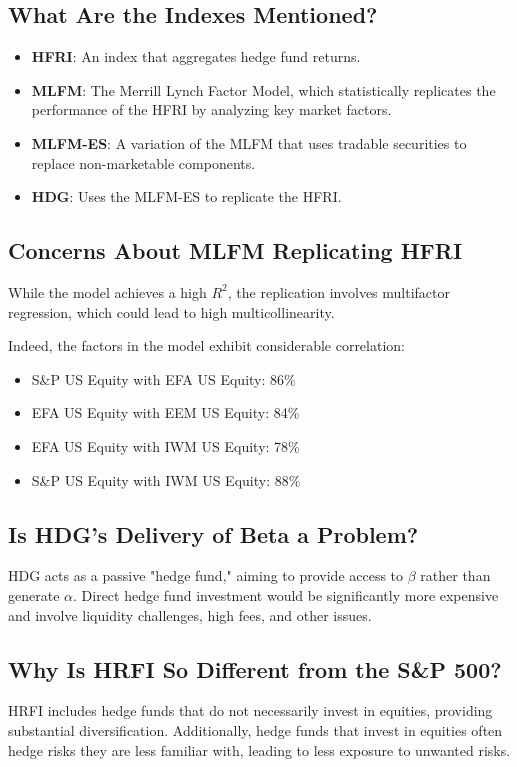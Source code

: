 \documentclass{article}
\begin{document}
\subsection{What Are the Indexes Mentioned?}
\begin{itemize}
    \item \textbf{HFRI}: An index that aggregates hedge fund returns.
    \item \textbf{MLFM}: The Merrill Lynch Factor Model, which statistically replicates the performance of the HFRI by analyzing key market factors.
    \item \textbf{MLFM-ES}: A variation of the MLFM that uses tradable securities to replace non-marketable components.
    \item \textbf{HDG}: Uses the MLFM-ES to replicate the HFRI.
\end{itemize}

\subsection{Concerns About MLFM Replicating HFRI}
While the model achieves a high $R^2$, the replication involves multifactor regression, which could lead to high multicollinearity.

Indeed, the factors in the model exhibit considerable correlation:
\begin{itemize}
    \item S\&P US Equity with EFA US Equity: 86\%
    \item EFA US Equity with EEM US Equity: 84\%
    \item EFA US Equity with IWM US Equity: 78\%
    \item S\&P US Equity with IWM US Equity: 88\%
\end{itemize}

\subsection{Is HDG's Delivery of Beta a Problem?}
HDG acts as a passive "hedge fund," aiming to provide access to $\beta$ rather than generate $\alpha$. Direct hedge fund investment would be significantly more expensive and involve liquidity challenges, high fees, and other issues.

\subsection{Why Is HRFI So Different from the S\&P 500?}
HRFI includes hedge funds that do not necessarily invest in equities, providing substantial diversification. Additionally, hedge funds that invest in equities often hedge risks they are less familiar with, leading to less exposure to unwanted risks.
\end{document}

